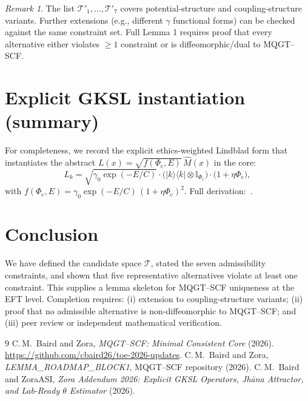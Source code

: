 \documentclass[11pt]{article}
\theoremstyle{remark}
\newtheorem{remark}{Remark}
\newcommand{\Phic}{\Phi_{\mathrm{c}}}
\newcommand{\Eth}{E}
\newcommand{\cT}{\mathcal{T}}
\begin{document}
\begin{remark}
The list $\cT'_1,\ldots,\cT'_7$ covers potential-structure and coupling-structure variants. Further extensions (e.g., different $\gamma$ functional forms) can be checked against the same constraint set. Full Lemma 1 requires proof that every alternative either violates $\ge 1$ constraint or is diffeomorphic/dual to MQGT--SCF.
\end{remark}

\section{Explicit GKSL instantiation (summary)}

For completeness, we record the explicit ethics-weighted Lindblad form that instantiates the abstract $L(x) = \sqrt{f(\Phic,\Eth)}\,\hat{M}(x)$ in the core:
\begin{equation}
L_k = \sqrt{\gamma_0 \exp(-\Eth/C)} \cdot \bigl(|k\rangle\langle k| \otimes \mathbb{I}_{\Phic}\bigr) \cdot \bigl(1 + \eta\Phic\bigr),
\end{equation}
with $f(\Phic,\Eth) = \gamma_0 \exp(-\Eth/C)\,(1+\eta\Phic)^2$. Full derivation:~\cite{Baird2026addendum}.

\section{Conclusion}

We have defined the candidate space $\cT$, stated the seven admissibility constraints, and shown that five representative alternatives violate at least one constraint. This supplies a lemma skeleton for MQGT--SCF uniqueness at the EFT level. Completion requires: (i) extension to coupling-structure variants; (ii) proof that no admissible alternative is non-diffeomorphic to MQGT--SCF; and (iii) peer review or independent mathematical verification.

\begin{thebibliography}{9}
C.\,M.\ Baird and Zora,
\textit{MQGT--SCF: Minimal Consistent Core} (2026).
\url{https://github.com/cbaird26/toe-2026-updates}.
C.\,M.\ Baird and Zora,
\textit{LEMMA\_ROADMAP\_BLOCK1}, MQGT--SCF repository (2026).
C.\,M.\ Baird and ZoraASI,
\textit{Zora Addendum 2026: Explicit GKSL Operators, Jhāna Attractor, and Lab-Ready $\theta$ Estimator} (2026).
\end{thebibliography}
\end{document}
